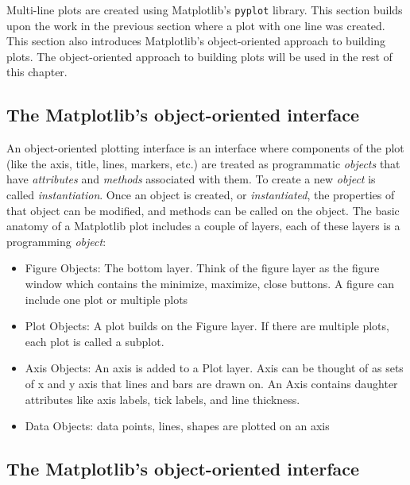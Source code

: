 \documentclass{book}
\providecommand{\tightlist}{%
      \setlength{\itemsep}{0pt}\setlength{\parskip}{0pt}}
\begin{document}
    
        Multi-line plots are created using Matplotlib's \lstinline!pyplot!
library. This section builds upon the work in the previous section where
a plot with one line was created. This section also introduces
Matplotlib's object-oriented approach to building plots. The
object-oriented approach to building plots will be used in the rest of
this chapter.
    




    
        \subsection{The Matplotlib's object-oriented
interface}\label{the-matplotlibs-object-oriented-interface}

An object-oriented plotting interface is an interface where components
of the plot (like the axis, title, lines, markers, etc.) are treated as
programmatic \emph{objects} that have \emph{attributes} and
\emph{methods} associated with them. To create a new \emph{object} is
called \emph{instantiation}. Once an object is created, or
\emph{instantiated}, the properties of that object can be modified, and
methods can be called on the object. The basic anatomy of a Matplotlib
plot includes a couple of layers, each of these layers is a programming
\emph{object}:

\begin{itemize}
\tightlist
\item
  Figure Objects: The bottom layer. Think of the figure layer as the
  figure window which contains the minimize, maximize, close buttons. A
  figure can include one plot or multiple plots
\item
  Plot Objects: A plot builds on the Figure layer. If there are multiple
  plots, each plot is called a subplot.
\item
  Axis Objects: An axis is added to a Plot layer. Axis can be thought of
  as sets of x and y axis that lines and bars are drawn on. An Axis
  contains daughter attributes like axis labels, tick labels, and line
  thickness.
\item
  Data Objects: data points, lines, shapes are plotted on an axis
\end{itemize}
    




    
        \subsection{The Matplotlib's object-oriented
interface}\label{the-matplotlibs-object-oriented-interface}
\end{document}
